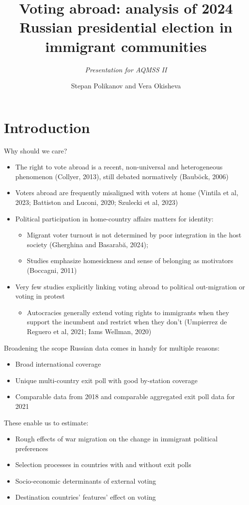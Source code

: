 \documentclass[xcolor=dvipsnames, 10pt]{beamer}
\title[UC3M]{Voting abroad: analysis of 2024 Russian presidential election in immigrant communities}
\subtitle{\vspace{1em}\textit{Presentation for AQMSS II}}
\author[AQMSS II]{Stepan Polikanov and Vera Okisheva}
\date{}
\begin{document}
\begin{frame}
\titlepage
\end{frame}

\section{Introduction}

\begin{frame}{Why should we care?}
\begin{itemize}
	\item The right to vote abroad is a recent, non-universal and heterogeneous phenomenon (Collyer, 2013), still debated normatively (Bauböck, 2006)
	\item Voters abroad are frequently misaligned with voters at home (Vintila et al, 2023; Battiston and Luconi, 2020; Szulecki et al, 2023)
	\item Political participation in home-country affairs matters for identity:
	\begin{itemize}
		\item Migrant voter turnout is not determined by poor integration in the host society (Gherghina and Basarabă, 2024);
		\item Studies emphasize homesickness and sense of belonging as motivators (Boccagni, 2011)
	\end{itemize}
	\item Very few studies explicitly linking voting abroad to political out-migration or voting in protest
	\begin{itemize}
		\item Autocracies generally extend voting rights to immigrants when they support the incumbent and restrict when they don't (Umpierrez de Reguero et al, 2021; Iams Wellman, 2020)
	\end{itemize}
\end{itemize}
\end{frame}

	\begin{frame}{Broadening the scope}
	Russian data comes in handy for multiple reasons:
	\begin{itemize}
		\item Broad international coverage
		\item Unique multi-country exit poll with good by-station coverage
		\item Comparable data from 2018 and comparable aggregated exit poll data for 2021
	\end{itemize}
	\vspace{1em}
	These enable us to estimate:
	\begin{itemize}
		\item Rough effects of war migration on the change in immigrant political preferences
		\item Selection processes in countries with and without exit polls
		\item Socio-economic determinants of external voting
		\item Destination countries' features' effect on voting
	\end{itemize}
	\end{frame}
\end{document}
